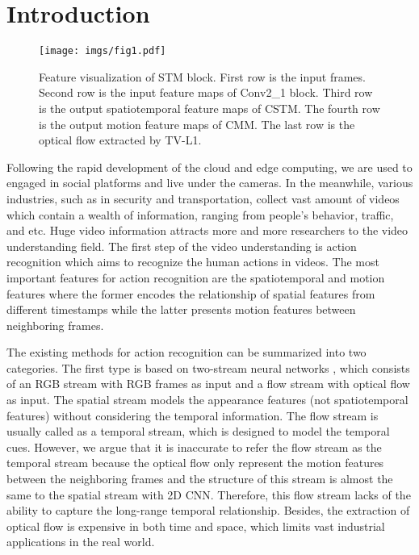 \documentclass[10pt,twocolumn,letterpaper]{article}
\begin{document}
\section{Introduction}
\begin{figure}[t]
	\begin{center}
		\texttt{[image: imgs/fig1.pdf]}
	\end{center}
	\caption{Feature visualization of STM block. First row is the input frames. Second row is the input feature maps of Conv2\_1 block. Third row is the output spatiotemporal feature maps of CSTM. The fourth row is the output motion feature maps of CMM. The last row is the optical flow extracted by TV-L1.}
	\label{feature map}
\end{figure}
Following the rapid development of the cloud and edge computing, we are used to engaged in social platforms and live under the cameras. In the meanwhile, various industries, such as in security and transportation, collect vast amount of videos which contain a wealth of information, ranging from people's behavior, traffic, and etc. Huge video information attracts more and more researchers to the video understanding field. The first step of the video understanding is action recognition which aims to recognize the human actions in videos. The most important features for action recognition are the spatiotemporal and motion features where the former encodes the relationship of spatial features from different timestamps while the latter presents motion features between neighboring frames.
	
The existing methods for action recognition can be summarized into two categories. The first type is based on two-stream neural networks \cite{feichtenhofer2016convolutional, wang2016temporal, wang2017spatiotemporal, feichtenhofer2017spatiotemporal}, which consists of an RGB stream with RGB frames as input and a flow stream with optical flow as input. The spatial stream models the appearance features (not spatiotemporal features) without considering the temporal information. The flow stream is usually called as a temporal stream, which is designed to model the temporal cues. However, we argue that it is inaccurate to refer the flow stream as the temporal stream because the optical flow only represent the motion features between the neighboring frames and the structure of this stream is almost the same to the spatial stream with 2D CNN. Therefore, this flow stream lacks of the ability to capture the long-range temporal relationship. Besides, the extraction of optical flow is expensive in both time and space, which limits vast industrial applications in the real world.
	
\end{document}
